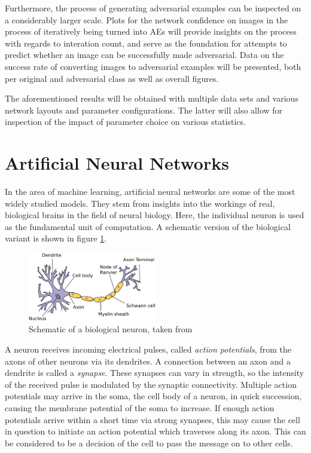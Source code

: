 \documentclass[11pt, a4paper]{article}
\begin{document}
Furthermore, the process of generating adversarial examples can be inspected on a considerably larger scale. Plots for the network confidence on images in the process of iteratively being turned into AEs will provide insights on the process with regards to interation count, and serve as the foundation for attempts to predict whether an image can be successfully made adversarial. Data on the success rate of converting images to adversarial examples will be presented, both per original and adversarial class as well as overall figures.

The aforementioned results will be obtained with multiple data sets and various network layouts and parameter configurations. The latter will also allow for inspection of the impact of parameter choice on various statistics.











\newpage
\section{Artificial Neural Networks}
\label{sec:artificial-neural-networks}
In the area of machine learning, artificial neural networks are some of the most widely studied models. They stem from insights into the workings of real, biological brains in the field of neural biology. Here, the individual neuron is used as the fundamental unit of computation. A schematic version of the biological variant is shown in figure \ref{fig:biological-neuron-schematic}.

\begin{figure}[h!tb]
	\centering
	\includegraphics[width=0.5\textwidth]{images/biological_neuron.png}
	\caption[Biological neuron]{Schematic of a biological neuron, taken from \cite{biological-neuron-schematic}}
	\label{fig:biological-neuron-schematic}
\end{figure}

A neuron receives incoming electrical pulses, called \emph{action potentials}, from the axons of other neurons via its dendrites. A connection between an axon and a dendrite is called a \emph{synapse}. These synapses can vary in strength, so the intensity of the received pulse is modulated by the synaptic connectivity. Multiple action potentials may arrive in the soma, the cell body of a neuron, in quick succession, causing the membrane potential of the soma to increase. If enough action potentials arrive within a short time via strong synapses, this may cause the cell in question to initiate an action potential which traverses along its axon. This can be considered to be a decision of the cell to pass the message on to other cells.
\end{document}
